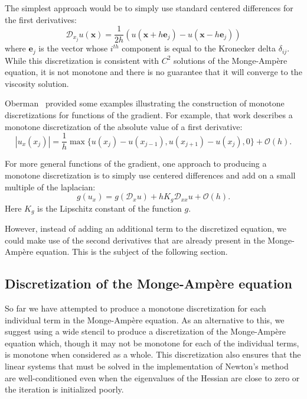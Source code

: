 \documentclass{amsart}
\theoremstyle{lemma}
\theoremstyle{remark}
\begin{document}
The simplest approach would be to simply use standard centered differences for the first derivatives:
\[ {\mathcal{D}}_{x_j}u({\mathbf{x}}) = \frac{1}{2h}(u({\mathbf{x}}+h{\mathbf{e}}_j) - u({\mathbf{x}}-h{\mathbf{e}}_j)) \]
where ${\mathbf{e}}_j$ is the vector whose $i^{th}$ component is equal to the Kronecker delta $\delta_{ij}$.  While this discretization is consistent with $C^2$ solutions of the {{Monge-Amp\`ere}\xspace} equation, it is not monotone and there is no guarantee that it will converge to the viscosity solution.

Oberman~\cite{ObermanSINUM} provided some examples illustrating the construction of monotone discretizations for functions of the gradient.  For example, that work describes a monotone discretization of the absolute value of a first derivative:
\[ {\left\vert{u_x(x_j)}\right\vert} = \frac{1}{h}\max\{u(x_j)-u(x_{j-1}),u(x_{j+1})-u(x_j),0\} + {\mathcal{O}}(h). \]

For more general functions of the gradient, one approach to producing a monotone discretization is to simply use centered differences and add on a small multiple of the laplacian:
\[ g(u_x) = g({\mathcal{D}}_xu) + hK_g{\mathcal{D}}_{xx}u + {\mathcal{O}}(h).\]
Here $K_g$ is the Lipschitz constant of the function $g$.

However, instead of adding an additional term to the discretized equation, we could make use of the second derivatives that are already present in the {{Monge-Amp\`ere}\xspace} equation.  This is the subject of the following section.

\subsection{Discretization of the {{Monge-Amp\`ere}\xspace} equation}\label{sec:discMA}
So far we have attempted to produce a monotone discretization for each individual term in the {{Monge-Amp\`ere}\xspace} equation.  
As an alternative to this, we suggest using a wide stencil to produce a discretization of the {{Monge-Amp\`ere}\xspace} equation which, though it may not be monotone for each of the individual terms, is monotone when considered as a whole.  This discretization also ensures that the linear systems that must be solved in the implementation of Newton's method are well-conditioned even when the eigenvalues of the Hessian are close to zero or the iteration is initialized poorly.
\end{document}
